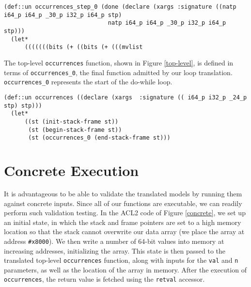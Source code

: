 \documentclass{eptcs}
\begin{document}
\begin{figure*}
\begin{verbatim}
(def::un occurrences_step_0 (done (declare (xargs :signature ((natp i64_p i64_p _30_p i32_p i64_p stp)
                              natp i64_p i64_p _30_p i32_p i64_p stp)))
  (let* 
      (((((((bits (+ ((bits (+ (((mvlist \end{verbatim}
\hrulefill
\caption{Generated ACL2 code for the occurrences loop body.}
\label{step_0}
\end{figure*}

The top-level \texttt{occurrences} function, shown in Figure
\ref{top-level}, is defined in terms of \texttt{occurrences\_0},
the final function admitted by our loop translation.
\texttt{occurrences\_0} represents the start of the do-while
loop.

\begin{figure*}
\begin{verbatim}
(def::un occurrences ((declare (xargs  :signature (( i64_p i32_p _24_p stp) stp)))
  (let*
      ((st (init-stack-frame st))
       (st (begin-stack-frame st))
       (st (occurrences_0 (end-stack-frame st)))
\end{verbatim}
\hrulefill
\caption{Generated top-level driver code for the translated occurrences example.}
\label{top-level}
\end{figure*}


\section{Concrete Execution}\label{exec}

It is advantageous to be able to validate the translated models by
running them against concrete inputs.  Since all of our functions are
executable, we can readily perform such validation testing.  In the ACL2 code
of Figure \ref{concrete}, we set up an initial state, in which the stack and frame
pointers are set to a high memory location so that the stack cannot
overwrite our data array (we place the array at address
\texttt{\#x8000}).  We then write a number of 64-bit values into
memory at increasing addresses, initializing the array.  This
state is then passed to the translated top-level \texttt{occurrences} function,
along with inputs for the \texttt{val} and \texttt{n} parameters, as
well as the location of the array in memory.  After the execution of
\texttt{occurrences}, the return value is fetched using the \texttt{retval}
accessor.
\end{document}

